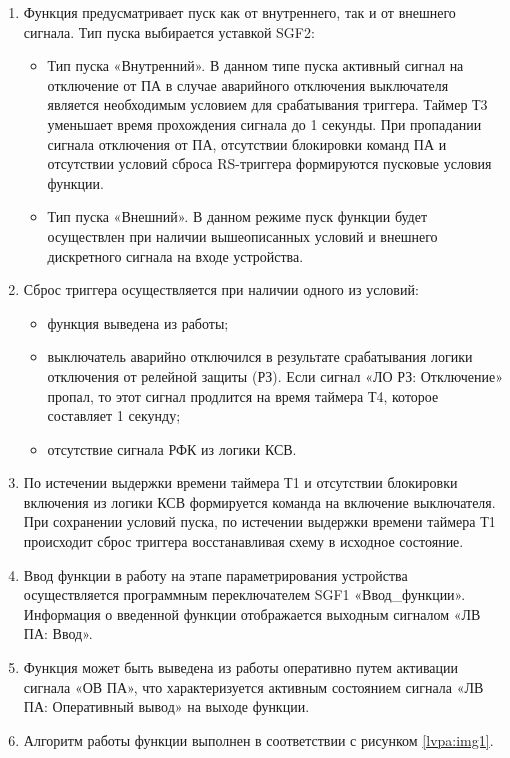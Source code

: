 \begin{enumerate}
\begin{enumerate}
\item
Функция предусматривает пуск как от внутреннего, так и от внешнего сигнала. Тип пуска выбирается уставкой SGF2:
\begin{itemize}
    \item Тип пуска «Внутренний». В данном типе пуска активный сигнал на отключение от ПА в случае аварийного отключения выключателя является необходимым условием для срабатывания триггера. Таймер Т3 уменьшает время прохождения сигнала до 1 секунды. При пропадании сигнала отключения от ПА, отсутствии блокировки команд ПА и отсутствии условий сброса RS-триггера формируются пусковые условия функции.
    \item Тип пуска «Внешний». В данном режиме пуск функции будет осуществлен при наличии вышеописанных условий и внешнего дискретного сигнала на входе устройства. 
\end{itemize}    
\item    
Сброс триггера осуществляется при наличии одного из условий:
\begin{itemize}
    \item функция выведена из работы;
    \item выключатель аварийно отключился в результате срабатывания логики отключения от релейной защиты (РЗ). Если сигнал «ЛО РЗ: Отключение» пропал, то этот сигнал продлится на время таймера Т4, которое составляет 1 секунду;
    \item отсутствие сигнала РФК из логики КСВ.
\end{itemize}

\item
По истечении выдержки времени таймера Т1 и отсутствии блокировки включения из логики КСВ формируется команда на включение выключателя. При сохранении условий пуска, по истечении выдержки времени таймера Т1 происходит сброс триггера восстанавливая схему в исходное состояние.

\item
Ввод функции в работу на этапе параметрирования устройства осуществляется программным переключателем SGF1 «Ввод\_функции». Информация о введенной функции отображается выходным сигналом «ЛВ ПА: Ввод».

\item
Функция может быть выведена из работы оперативно путем активации сигнала «ОВ ПА», что характеризуется активным состоянием сигнала «ЛВ ПА: Оперативный вывод» на выходе функции.

\item
Алгоритм работы функции выполнен в соответствии с рисунком \ref{lvpa:img1}. 


\end{enumerate}
\end{enumerate}
